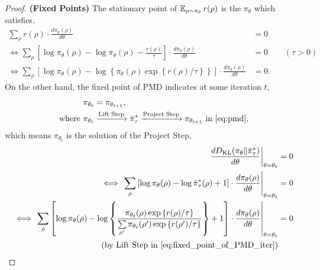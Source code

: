 \begin{proof}
	{\bf (Fixed Points)} The stationary point of $\operatorname{\mathbb{E}}_{\rho \sim \pi_\theta}{  r(\rho)}$ is the $\pi_\theta$ which satisfies,
	\begin{equation}
	\label{eq:stationary_point_of_expected_reward}
	\begin{split}
		\sum\limits_{\rho}{r(\rho) \cdot \frac{d \pi_{\theta}(\rho)}{d \theta}} &= 0 \\
		\iff \sum\limits_{\rho}{ \left[ \log{\pi_\theta(\rho)} - \log{\pi_\theta(\rho)} - \frac{r(\rho)}{\tau} \right] \cdot \frac{d \pi_{\theta}(\rho)}{d \theta}} &= 0 \qquad (\tau > 0) \\
		\iff \sum\limits_{\rho}{ \left[ \log{\pi_\theta(\rho)} - \log\left\{\pi_\theta(\rho) \exp\left\{r(\rho) / \tau\right\} \right\}  \right] \cdot \frac{d \pi_{\theta}(\rho)}{d \theta}} &= 0.
	\end{split}
	\end{equation}
	On the other hand, the fixed point of PMD indicates at some iteration $t$,
	\begin{equation}
	\label{eq:fixed_point_of_PMD_iter}
	\begin{split}
		&\pi_{\theta_t} = \pi_{\theta_{t+1}}, \\
		\text{where } &\pi_{\theta_t} \xrightarrow{\text{Lift Step}} \bar{\pi}_\tau^* \xrightarrow{\text{Project Step}} \pi_{\theta_{t+1}} \text{ in \cref{eq:pmd}},
	\end{split}
	\end{equation}
	which means $\pi_{\theta_t}$ is the solution of the Project Step,
	\begin{equation}
	\label{eq:solution_of_project_step}
	\begin{split}
		\left. \frac{d \KL( \pi_{\theta} \| \bar{\pi}_\tau^*) }{d \theta}  \right\vert _{\theta = \theta_t} &= 0 \\
		\iff \left. \sum\limits_{\rho}{ \left[ \log{\pi_\theta(\rho)} - \log{ \bar{\pi}_\tau^*(\rho) } + 1 \right] \cdot \frac{d \pi_{\theta}(\rho)}{d \theta} } \right\vert_{\theta = \theta_t} &= 0 \\
		\iff \left. \sum\limits_{\rho}{ \left[ \log{\pi_\theta(\rho)} - \log\left\{ \frac{ \pi_{\theta_t}(\rho) \exp\left\{r(\rho) / \tau\right\}}{ \sum\limits_{\rho^\prime}{\pi_{\theta_t}(\rho^\prime) \exp\left\{r(\rho^\prime) / \tau\right\} } } \right\} + 1 \right] \cdot \frac{d \pi_{\theta}(\rho)}{d \theta} } \right\vert_{\theta = \theta_t} &= 0 \\
		\text{(by Lift Step in \cref{eq:fixed_point_of_PMD_iter})}& \\

\end{split}
\end{equation}
\end{proof}
